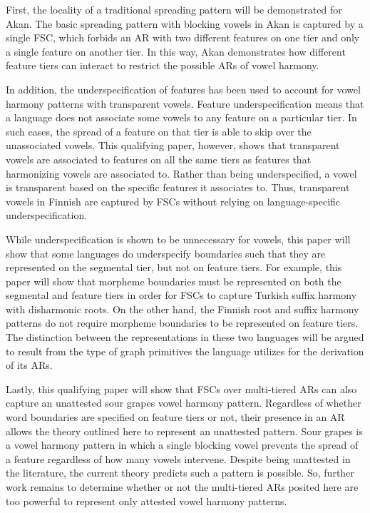 \documentclass[,doc,floatsintext]{apa6}
\theoremstyle{definition}
\theoremstyle{definition}
\theoremstyle{definition}
\theoremstyle{remark}
\begin{document}
First, the locality of a traditional spreading pattern will be
demonstrated for Akan. The basic spreading pattern with blocking vowels
in Akan is captured by a single FSC, which forbids an AR with two
different features on one tier and only a single feature on another
tier. In this way, Akan demonstrates how different feature tiers can
interact to restrict the possible ARs of vowel harmony.

In addition, the underspecification of features has been used to account
for vowel harmony patterns with transparent vowels. Feature
underspecification means that a language does not associate some vowels
to any feature on a particular tier. In such cases, the spread of a
feature on that tier is able to skip over the unassociated vowels. This
qualifying paper, however, shows that transparent vowels are associated
to features on all the same tiers as features that harmonizing vowels
are associated to. Rather than being underspecified, a vowel is
transparent based on the specific features it associates to. Thus,
transparent vowels in Finnish are captured by FSCs without relying on
language-specific underspecification.

While underspecification is shown to be unnecessary for vowels, this
paper will show that some languages do underspecify boundaries such that
they are represented on the segmental tier, but not on feature tiers.
For example, this paper will show that morpheme boundaries must be
represented on both the segmental and feature tiers in order for FSCs to
capture Turkish suffix harmony with disharmonic roots. On the other
hand, the Finnish root and suffix harmony patterns do not require
morpheme boundaries to be represented on feature tiers. The distinction
between the representations in these two languages will be argued to
result from the type of graph primitives the language utilizes for the
derivation of its ARs.

Lastly, this qualifying paper will show that FSCs over multi-tiered ARs
can also capture an unattested sour grapes vowel harmony pattern.
Regardless of whether word boundaries are specified on feature tiers or
not, their presence in an AR allows the theory outlined here to
represent an unattested pattern. Sour grapes is a vowel harmony pattern
in which a single blocking vowel prevents the spread of a feature
regardless of how many vowels intervene. Despite being unattested in the
literature, the current theory predicts such a pattern is possible. So,
further work remains to determine whether or not the multi-tiered ARs
posited here are too powerful to represent only attested vowel harmony
patterns.
\end{document}
